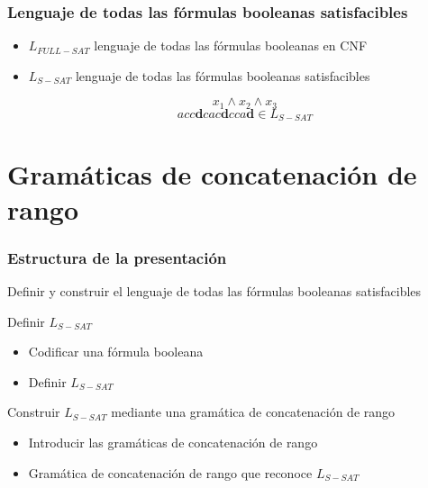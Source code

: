 \documentclass{beamer}
\begin{document}
\begin{frame}
    \frametitle{Lenguaje de todas las fórmulas booleanas satisfacibles}

    \begin{itemize}
        \item $L_{FULL-SAT}$ lenguaje de todas las fórmulas booleanas en CNF
              \pause
        \item  $L_{S-SAT}$ lenguaje de todas las fórmulas booleanas satisfacibles
              \pause
              \begin{Large}

                  $$x_1\wedge x_2 \wedge x_3$$
                  $$acc\mathbf{d}cac\mathbf{d}cca\mathbf{d}\in L_{S-SAT}$$

              \end{Large}

    \end{itemize}
\end{frame}


\section{Gramáticas de concatenación de rango}

\begin{frame}
    \frametitle{Estructura de la presentación}

    Definir y construir el lenguaje de todas las fórmulas booleanas satisfacibles


    \begin{block}{Definir $L_{S-SAT}$}
        \begin{itemize}
            \item Codificar una fórmula booleana
            \item Definir $L_{S-SAT}$
        \end{itemize}
    \end{block}


    \begin{block}{Construir $L_{S-SAT}$ mediante una gramática de concatenación de rango}
        \begin{itemize}
            \item Introducir las gramáticas de concatenación de rango
            \item Gramática de concatenación de rango que reconoce $L_{S-SAT}$
        \end{itemize}
    \end{block}
\end{frame}
\end{document}
